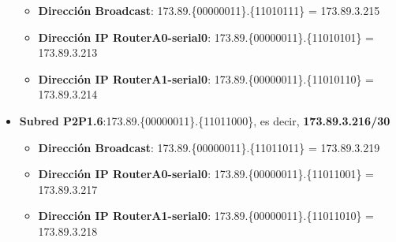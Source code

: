 \begin{itemize}
		\begin{itemize}
			\item{\textbf{Dirección Broadcast}}: 173.89.\{\textcolor{azul}{000000}\textcolor{rojo}{11}\}.\{\textcolor{rojo}{110101}11\} = 173.89.3.215
			\item{\textbf{Dirección IP RouterA0-serial0}}: 173.89.\{\textcolor{azul}{000000}\textcolor{rojo}{11}\}.\{\textcolor{rojo}{110101}01\} = 173.89.3.213
			\item{\textbf{Dirección IP RouterA1-serial0}}: 173.89.\{\textcolor{azul}{000000}\textcolor{rojo}{11}\}.\{\textcolor{rojo}{110101}10\} = 173.89.3.214
		\end{itemize}
	\item{\textbf{Subred P2P1.6}:}173.89.\{\textcolor{azul}{000000}\textcolor{rojo}{11}\}.\{\textcolor{rojo}{110110}00\}, es decir, \textbf{173.89.3.216/30}
		\begin{itemize}
			\item{\textbf{Dirección Broadcast}}: 173.89.\{\textcolor{azul}{000000}\textcolor{rojo}{11}\}.\{\textcolor{rojo}{110110}11\} = 173.89.3.219
			\item{\textbf{Dirección IP RouterA0-serial0}}: 173.89.\{\textcolor{azul}{000000}\textcolor{rojo}{11}\}.\{\textcolor{rojo}{110110}01\} = 173.89.3.217
			\item{\textbf{Dirección IP RouterA1-serial0}}: 173.89.\{\textcolor{azul}{000000}\textcolor{rojo}{11}\}.\{\textcolor{rojo}{110110}10\} = 173.89.3.218
		\end{itemize}
\end{itemize}

